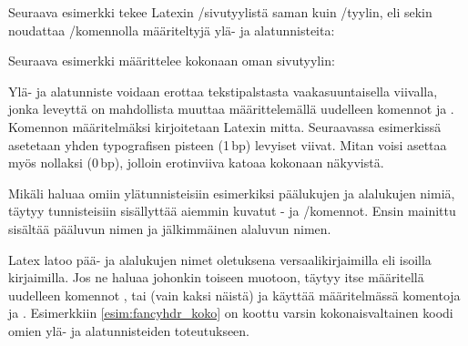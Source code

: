 Seuraava esimerkki tekee Latexin \-/sivutyylistä saman kuin
\-/tyylin, eli sekin noudattaa \-/komennolla määriteltyjä ylä- ja alatunnisteita:

\begin{koodilohkosis}
\end{koodilohkosis}

Seuraava esimerkki määrittelee kokonaan oman sivutyylin:

\begin{koodilohkosis}
\end{koodilohkosis}

Ylä- ja alatunniste voidaan erottaa tekstipalstasta vaakasuuntaisella
viivalla, jonka leveyttä on mahdollista muuttaa määrittelemällä
uudelleen komennot  ja . Komennon määritelmäksi kirjoitetaan Latexin mitta.
Seuraavassa esimerkissä asetetaan yhden typografisen pisteen (1\,bp)
levyiset viivat. Mitan voisi asettaa myös nollaksi (0\,bp), jolloin
erotinviiva katoaa kokonaan näkyvistä.

\begin{koodilohkosis}
  \renewcommand{\headrulewidth}{1bp} %
  \renewcommand{\footrulewidth}{1bp} %
\end{koodilohkosis}

Mikäli haluaa omiin ylätunnisteisiin esimerkiksi päälukujen ja
alalukujen nimiä, täytyy tunnisteisiin sisällyttää aiemmin kuvatut
- ja \-/komennot. Ensin
mainittu sisältää pääluvun nimen ja jälkimmäinen alaluvun nimen.

\begin{koodilohkosis}
  \fancyhf[HEL]{\leftmark}
  \fancyhf[HOR]{\rightmark}
\end{koodilohkosis}

Latex latoo pää- ja alalukujen nimet oletuksena versaalikirjaimilla eli
isoilla kirjaimilla. Jos ne haluaa johonkin toiseen muotoon, täytyy itse
määritellä uudelleen komennot ,  tai  (vain kaksi
näistä) ja käyttää määritelmässä komentoja  ja
. Esimerkkiin \ref{esim:fancyhdr_koko} on
koottu varsin kokonaisvaltainen koodi omien ylä- ja alatunnisteiden
toteutukseen.

